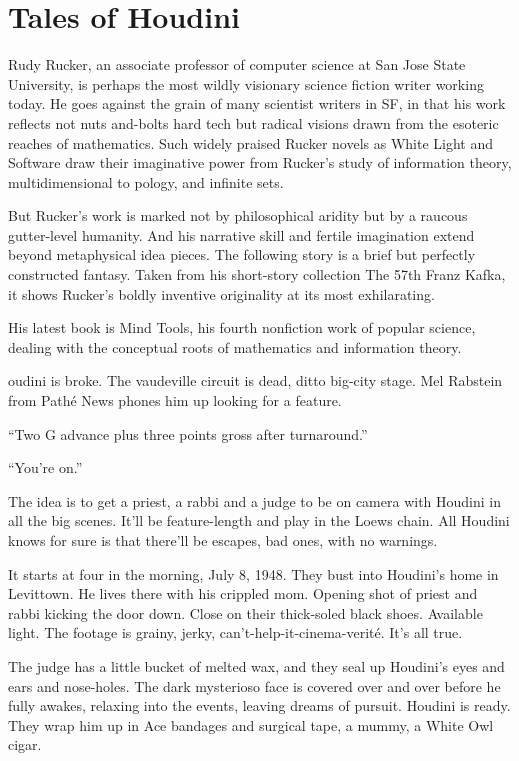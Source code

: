 \chapter{Tales of Houdini}

Rudy Rucker, an associate professor of computer science at San Jose State University, is perhaps the most wildly visionary science fiction writer working today. He goes against the grain of many scientist writers in SF, in that his work reflects not nuts and-bolts hard tech but radical visions drawn from the esoteric reaches of mathematics. Such widely praised Rucker novels as White Light and Software draw their imaginative power from Rucker's study of information theory, multidimensional to pology, and infinite sets.

But Rucker's work is marked not by philosophical aridity but by a raucous gutter-level humanity. And his narrative skill and fertile imagination extend beyond metaphysical idea pieces. The following story is a brief but perfectly constructed fantasy. Taken from his short-story collection The 57th Franz Kafka, it shows Rucker's boldly inventive originality at its most exhilarating.

His latest book is Mind Tools, his fourth nonfiction work of popular science, dealing with the conceptual roots of mathematics and information theory.

\hrulefill

oudini is broke. The vaudeville circuit is dead, ditto big-city stage. Mel Rabstein from Pathé News phones him up looking for a feature.

“Two G advance plus three points gross after turnaround.”

“You’re on.”

The idea is to get a priest, a rabbi and a judge to be on camera with Houdini in all the big scenes. It’ll be feature-length and play in the Loews chain. All Houdini knows for sure is that there’ll be escapes, bad ones, with no warnings.

It starts at four in the morning, July 8, 1948. They bust into Houdini’s home in Levittown. He lives there with his crippled mom. Opening shot of priest and rabbi kicking the door down. Close on their thick-soled black shoes. Available light. The footage is grainy, jerky, can’t-help-it-cinema-verité. It’s all true.

The judge has a little bucket of melted wax, and they seal up Houdini’s eyes and ears and nose-holes. The dark mysterioso face is covered over and over before he fully awakes, relaxing into the events, leaving dreams of pursuit. Houdini is ready. They wrap him up in Ace bandages and surgical tape, a mummy, a White Owl cigar.

